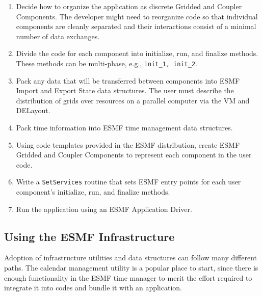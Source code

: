 \begin{enumerate}

\item Decide how to organize the application as discrete Gridded 
and Coupler Components.  The developer might need to reorganize code
so that individual components are cleanly separated and their 
interactions consist of a minimal number of data exchanges.

\item Divide the code for each component into initialize, run, and
finalize methods.  These methods can be multi-phase, e.g., 
{\tt init\_1, init\_2}.

\item Pack any data that will be transferred between components
into ESMF Import and Export State data structures.  The user must 
describe the distribution of grids over resources on a parallel
computer via the VM and DELayout.

\item Pack time information into ESMF time management data 
structures.

\item Using code templates provided in the ESMF distribution, create
ESMF Gridded and Coupler Components to represent each component
in the user code.

\item Write a {\tt SetServices} routine that sets ESMF entry 
points for each user component's initialize, run, and finalize 
methods.

\item Run the application using an ESMF Application Driver.

\end{enumerate} 

\subsection{Using the ESMF Infrastructure}

Adoption of infrastructure utilities and data structures can
follow many different paths.  The calendar management utility 
is a popular place to start, since there is enough functionality
in the ESMF time manager to merit the effort required to 
integrate it into codes and bundle it with an application.








